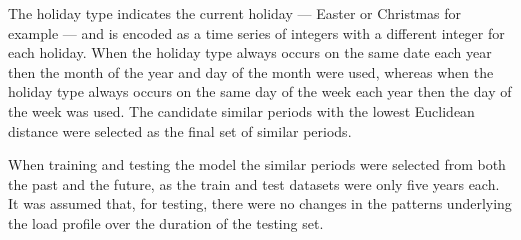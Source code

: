 The holiday type indicates the current holiday --- Easter or Christmas for example --- and is encoded as a time series of integers with a different integer for each holiday.
When the holiday type always occurs on the same date each year then the month of the year and day of the month were used, whereas when the holiday type always occurs on the same day of the week each year then the day of the week was used.
The candidate similar periods with the lowest Euclidean distance were selected as the final set of similar periods.

When training and testing the model the similar periods were selected from both the past and the future, as the train and test datasets were only five years each.
It was assumed that, for testing, there were no changes in the patterns underlying the load profile over the duration of the testing set.